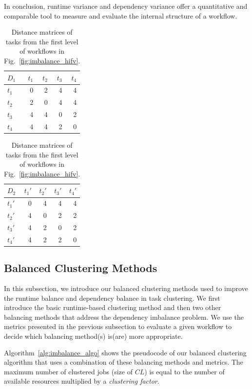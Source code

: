 In conclusion, runtime variance and dependency variance offer a quantitative and comparable tool to measure and evaluate the internal structure of a workflow. 


\begin{table}[htb]
	\footnotesize
	\centering
	\begin{tabular}{l|rrrr}
		$D_1$ & $t_1$ & $t_2$ & $t_3$ &$t_4$\\
		\hline
		$t_1$ & 0 & 2 & 4 & 4 \\
		$t_2$ & 2 & 0 & 4 & 4 \\
		$t_3$ & 4 & 4 & 0 & 2\\
		$t_4$ & 4 & 4 & 2 & 0 \\
	\end{tabular}
	\quad
	\begin{tabular}{l|rrrr}
		$D_2$ & $t_1'$ & $t_2'$ & $t_3'$ &$t_4'$\\
		\hline
		$t_1'$ & 0 & 4 & 4 & 4 \\
		$t_2'$ & 4 & 0 & 2 & 2 \\
		$t_3'$ & 4 & 2 & 0 & 2\\
		$t_4'$ & 4 & 2 & 2 & 0 \\
	\end{tabular}
	\caption{Distance matrices of tasks from the first level of workflows in Fig.~\ref{fig:imbalance_hifv}.}
	\label{tab:imblance_metric}
\end{table}


\subsection{Balanced Clustering Methods}
\label{sec:methods}
In this subsection, we introduce our balanced clustering methods used to improve the runtime balance and dependency balance in task clustering. We first introduce the basic runtime-based clustering method and then two other balancing methods that address the dependency imbalance problem. We use the metrics presented in the previous subsection to evaluate a given workflow to decide which balancing method(s) is(are) more appropriate. 

Algorithm~\ref{alg:imbalance_algo} shows the pseudocode of our balanced clustering algorithm that uses a combination of these balancing methods and metrics.  The maximum number of clustered jobs (size of $CL$) is equal to the number of available resources multiplied by a \emph{clustering factor}. 

